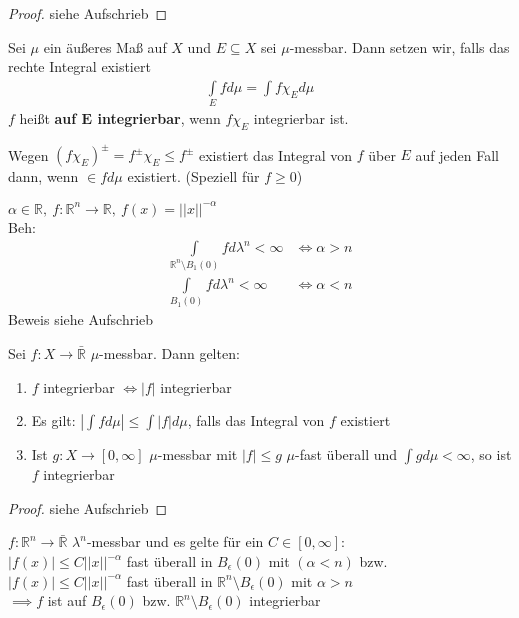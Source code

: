   \begin{proof}
    siehe Aufschrieb
  \end{proof}

  \begin{definition}
    Sei $\mu$ ein äußeres Maß auf $X$ und $E \subseteq X$ sei $\mu$-messbar. Dann setzen wir, falls das rechte Integral existiert
    \begin{align*}
      \int\limits_E f d\mu = \int f \chi_E d\mu
    \end{align*}
    $f$ heißt \textbf{auf $\bm{E}$ integrierbar}, wenn $f \chi_E$ integrierbar ist.
  \end{definition}

  \begin{remark}
    Wegen $(f \chi_E)^{\pm} = f^{\pm} \chi_E \leq f^{\pm}$ existiert das Integral von $f$ über $E$ auf jeden Fall dann, wenn $\in f d\mu$ existiert. (Speziell für $f \geq 0$)
  \end{remark}

  \begin{example}
    $\alpha \in \mathbb{R}, \ f:\mathbb{R}^n \to \mathbb{R}, \ f(x) = ||x||^{-\alpha}$\\
    Beh: 
    \begin{align*}
      \int\limits_{\mathbb{R}^n \setminus B_1(0)} f d\lambda^n < \infty &\Leftrightarrow \alpha > n\\
      \int\limits_{B_1(0)} f d\lambda^n < \infty &\Leftrightarrow \alpha < n
    \end{align*}
    Beweis siehe Aufschrieb
  \end{example}

  \begin{theorem}
    Sei $f: X \to \bar{\mathbb{R}}$ $\mu$-messbar. Dann gelten:
    \begin{enumerate}[label=\roman*)]
      \item $f$ integrierbar $\Leftrightarrow |f|$ integrierbar
      \item Es gilt: $|\int f d\mu| \leq \int |f| d\mu$, falls das Integral von $f$ existiert
      \item Ist $g: X \to [0, \infty]$ $\mu$-messbar mit $|f| \leq g$ $\mu$-fast überall und $\int g d\mu < \infty$, so ist $f$ integrierbar 
    \end{enumerate}
  \end{theorem}

  \begin{proof}
    siehe Aufschrieb
  \end{proof}

  \begin{example}
    $f: \mathbb{R}^n \to \bar{\mathbb{R}}$ $\lambda^n$-messbar und es gelte für ein $C \in [0, \infty]$:\\
    $|f(x)| \leq C ||x||^{-\alpha}$ fast überall in $B_{\epsilon}(0)$ mit $(\alpha < n)$ bzw.\\
    $|f(x)| \leq C ||x||^{-\alpha}$ fast überall in $\mathbb{R}^n \setminus B_{\epsilon}(0)$ mit $\alpha > n$\\
    $\implies f$ ist auf $B_{\epsilon}(0)$ bzw. $\mathbb{R}^n \setminus B_{\epsilon}(0)$ integrierbar
  \end{example}

  